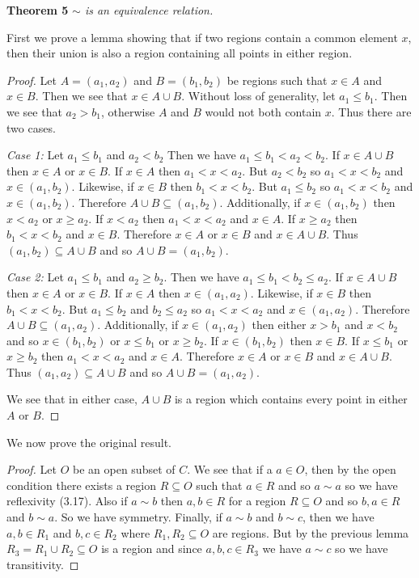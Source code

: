 \documentclass{article}
\begin{document}
\begin{flushleft}
\textbf{Theorem 5}
\textsl{$\sim$ is an equivalence relation.}\newline

First we prove a lemma showing that if two regions contain a common element $x$, then their union is also a region containing all points in either region.
\begin{proof}
Let $A=(a_1,a_2)$ and $B=(b_1,b_2)$ be regions such that $x \in A$ and $x \in B$. Then we see that $x \in A \cup B$. Without loss of generality, let $a_1 \leq b_1$. Then we see that $a_2>b_1$, otherwise $A$ and $B$ would not both contain $x$. Thus there are two cases.\newline

\textsl{Case 1:} Let $a_1 \leq b_1$ and $a_2<b_2$ Then we have $a_1 \leq b_1<a_2<b_2$. If $x \in A \cup B$ then $x \in A$ or $x \in B$. If $x \in A$ then $a_1<x<a_2$. But $a_2<b_2$ so $a_1<x<b_2$ and $x \in (a_1,b_2)$. Likewise, if $x \in B$ then $b_1<x<b_2$. But $a_1 \leq b_2$ so $a_1<x<b_2$ and $x \in (a_1,b_2)$. Therefore $A \cup B \subseteq (a_1,b_2)$. Additionally, if $x \in (a_1,b_2)$ then $x<a_2$ or $x \geq a_2$. If $x<a_2$ then $a_1<x<a_2$ and $x \in A$. If $x \geq a_2$ then $b_1<x<b_2$ and $x \in B$. Therefore $x \in A$ or $x \in B$ and $x \in A \cup B$. Thus $(a_1,b_2) \subseteq A \cup B$ and so $A \cup B = (a_1,b_2)$.\newline

\textsl{Case 2:} Let $a_1 \leq b_1$ and $a_2 \geq b_2$. Then we have $a_1 \leq b_1<b_2 \leq a_2$. If $x \in A \cup B$ then $x \in A$ or $x \in B$. If $x \in A$ then $x \in (a_1,a_2)$. Likewise, if $x \in B$ then $b_1<x<b_2$. But $a_1 \leq b_2$ and $b_2 \leq a_2$ so $a_1<x<a_2$ and $x \in (a_1,a_2)$. Therefore $A \cup B \subseteq (a_1,a_2)$. Additionally, if $x \in (a_1,a_2)$ then either $x>b_1$ and $x<b_2$ and so $x \in (b_1,b_2)$ or $x \leq b_1$ or $x \geq b_2$. If $x \in (b_1,b_2)$ then $x \in B$. If $x \leq b_1$ or $x \geq b_2$ then $a_1<x<a_2$ and $x \in A$. Therefore $x \in A$ or $x \in B$ and $x \in A \cup B$. Thus $(a_1,a_2) \subseteq A \cup B$ and so $A \cup B = (a_1,a_2)$.\newline

We see that in either case, $A \cup B$ is a region which contains every point in either $A$ or $B$.
\end{proof}
We now prove the original result.
\begin{proof}
Let $O$ be an open subset of $C$. We see that if a $a \in O$, then by the open condition there exists a region $R \subseteq O$ such that $a \in R$ and so $a \sim a$ so we have reflexivity (3.17). Also if $a \sim b$ then $a,b \in R$ for a region $R \subseteq O$ and so $b,a \in R$ and $b \sim a$. So we have symmetry. Finally, if $a \sim b$ and $b \sim c$, then we have $a,b \in R_1$ and $b,c \in R_2$ where $R_1,R_2 \subseteq O$ are regions. But by the previous lemma $R_3=R_1 \cup R_2 \subseteq O$ is a region and since $a,b,c \in R_3$ we have $a \sim c$ so we have transitivity.
\end{proof}


\end{flushleft}
\end{document}
